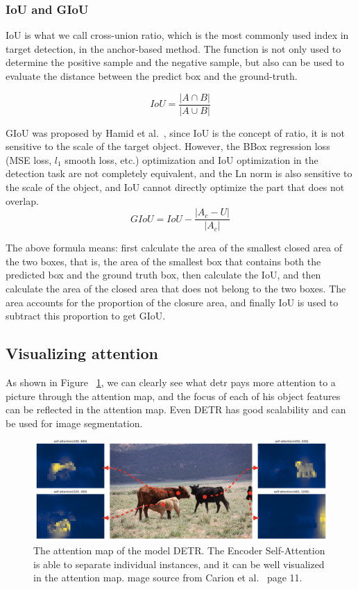 \subsubsection{IoU and GIoU}

IoU is what we call cross-union ratio, which is the most commonly used index in target detection, in the anchor-based method. The function is not only used to determine the positive sample and the negative sample, but also can be used to evaluate the distance between the predict box and the ground-truth.

$$
I o U=\frac{|A \cap B|}{|A \cup B|}
$$

GIoU was proposed by Hamid et al.~\cite{rezatofighi2019generalized}, since IoU is the concept of ratio, it is not sensitive to the scale of the target object. However, the BBox regression loss (MSE loss, $ l_1 $ smooth loss, etc.) optimization and IoU optimization in the detection task are not completely equivalent, and the Ln norm is also sensitive to the scale of the object, and IoU cannot directly optimize the part that does not overlap.
$$
G I o U=I o U-\frac{\left|A_{c}-U\right|}{\left|A_{c}\right|}
$$

The above formula means: first calculate the area of the smallest closed area of the two boxes, that is, the area of the smallest box that contains both the predicted box and the ground truth box, then calculate the IoU, and then calculate the area of the closed area that does not belong to the two boxes. The area accounts for the proportion of the closure area, and finally IoU is used to subtract this proportion to get GIoU.


\subsection{Visualizing attention}
As shown in Figure ~\ref{fig:detrattentionmap}, we can clearly see what detr pays more attention to a picture through the attention map, and the focus of each of his object features can be reflected in the attention map. Even DETR has good scalability and can be used for image segmentation.

\begin{figure}
	\centering
	\includegraphics[width=1\linewidth]{figures/detr_attention_map}
	\caption[The attention map of the model DETR]{The attention map of the model DETR. The Encoder Self-Attention is able to separate individual instances, and it can be well visualized in the attention map. mage source from Carion et al.~\cite{carion2020end} page 11.}
	\label{fig:detrattentionmap}
\end{figure}



